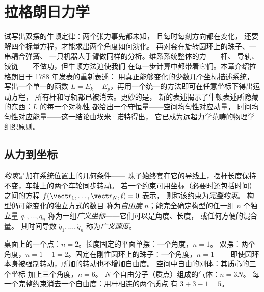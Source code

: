 \chapter{拉格朗日力学}\label{ch:b3:lagrangian-mechanics}

试写出双摆的牛顿定律：两个张力事先都未知，
且每时每刻方向都在变化，
还要解四个标量方程，才能求出两个角度如何演化。
再对套在旋转圆环上的珠子、一串耦合弹簧、
一只机器人手臂做同样的分析。维系系统整体的力——杆、
导轨、铰链——不做功，但牛顿方法迫使我们
在每一步计算中都带着它们。本章介绍拉格朗日于 1788 年发表的重新表述：
用真正能够变化的少数几个坐标描述系统，
写出一个单一的函数
$L = E_k - E_p$，再用一个统一的方法即可在任意坐标下得出运动方程，
所有杆和导轨都已被消去。更妙的是，
新的表述揭示了牛顿表述所隐藏的东西：$L$ 的每一个对称性
都给出一个守恒量——空间均匀性对应动量，
时间均匀性对应能量——这一结论由埃米·诺特得出，
它已成为远超力学范畴的物理学组织原则。

\section{从力到坐标}

\begin{definition}\label{def:b3:lagrangian-mechanics:coordinates}
\emph{约束}是加在系统位置上的几何条件——
珠子始终套在它的导线上，摆杆长度保持不变，车轴上的两个车轮同步转动。
若一个约束可用坐标（必要时还包括时间）之间的方程
$f(\vect r_1, \dots, \vect r_N, t) = 0$ 表示，
则称该约束为\emph{完整约束}。
构型仍可能变化的独立方式的数目
称为\emph{自由度} $n$；能完全确定构型的任一组 $n$ 个独立量
$q_1, \dots, q_n$ 称为一组\emph{广义坐标}——它们可以是角度、长度，
或任何方便的混合量。
其时间导数 $\dot q_1, \dots, \dot q_n$
称为\emph{广义速度}。
\end{definition}

\begin{example}[自由度计数]\label{ex:b3:lagrangian-mechanics:counting}
桌面上的一个点：$n = 2$。长度固定的平面单摆：一个角度，$n = 1$。
双摆：两个角度，$n = 1 + 1 = 2$。固定在刚性圆环上的珠子：一个角度，$n = 1$——
即使圆环本身被强制转动，所加的转动也不增加自由度。
空间中自由的刚体：其质心的三个坐标
加上三个角度，$n = 6$。
$N$ 个自由分子（质点）组成的气体：$n = 3N$。
每一个完整约束消去一个自由度：用杆相连的两个质点
有 $3 + 3 - 1 = 5$。
\end{example}

